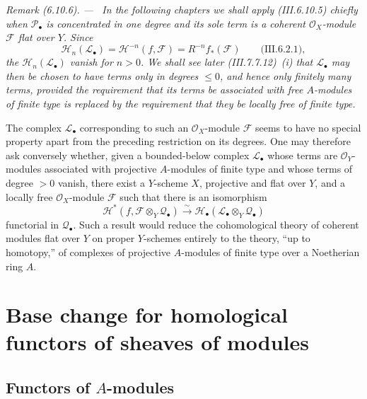 \documentclass[10pt,oneside]{book}
\newcommand{\sh}[1]{\mathscr{#1}}
\newcommand{\sref}[2][]{(#2)}
\newcommand{\oldpage}[2][]{\setcounter{footnote}{0}\marginpar{\scriptsize\textbf{#1}~|~#2}\ignorespaces}
\newenvironment{remark}[1][]{\par\medskip\noindent\itshape Remark (#1). ---\ }{\par}
\begin{document}
\begin{remark}[6.10.6]
\label{III.6.10.6}
In the following chapters we shall apply \sref{III.6.10.5}
chiefly when $\sh P_\bullet$ is concentrated in one degree and
its sole term is a coherent $\sh O_X$-module $\sh F$ flat over
$Y$.  Since
\[
  \sh H_n(\sh L_\bullet)
  =
  \sh H^{-n}(f,\sh F)
  =
  R^{-n}f_*(\sh F)
  \qquad\text{\sref{III.6.2.1}},
\]
the $\sh H_n(\sh L_\bullet)$ vanish for $n>0$.  We shall see
later \sref{III.7.7.12}~(i) that $\sh L_\bullet$ may then be
chosen to have terms only in degrees $\leq0$, and hence only
finitely many terms, provided the requirement that its terms
be associated with free $A$-modules of finite type is replaced
by the requirement that they be locally free of finite type.

The complex $\sh L_\bullet$ corresponding to such an
$\sh O_X$-module $\sh F$ seems to have no special property
\oldpage[III]{175}
apart from the preceding restriction on its degrees.  One may
therefore ask conversely whether, given a bounded-below complex
$\sh L_\bullet$ whose terms are $\sh O_Y$-modules associated
with projective $A$-modules of finite type and whose terms of
degree $>0$ vanish, there exist a $Y$-scheme $X$, projective and
flat over $Y$, and a locally free $\sh O_X$-module $\sh F$ such
that there is an isomorphism
\[
  \sh H^*
  (f,\sh F\otimes_Y\sh Q_\bullet)
  \xrightarrow{\sim}
  \sh H_\bullet
  (\sh L_\bullet\otimes_Y\sh Q_\bullet)
\]
functorial in $\sh Q_\bullet$.  Such a result would reduce the
cohomological theory of coherent modules flat over $Y$ on
proper $Y$-schemes entirely to the theory, ``up to homotopy,''
of complexes of projective $A$-modules of finite type over a
Noetherian ring $A$.
\end{remark}
\section{Base change for homological functors of sheaves of modules}
\label{section:III.7}


\subsection{Functors of $A$-modules}
\label{subsection:III.7.1}
\end{document}
